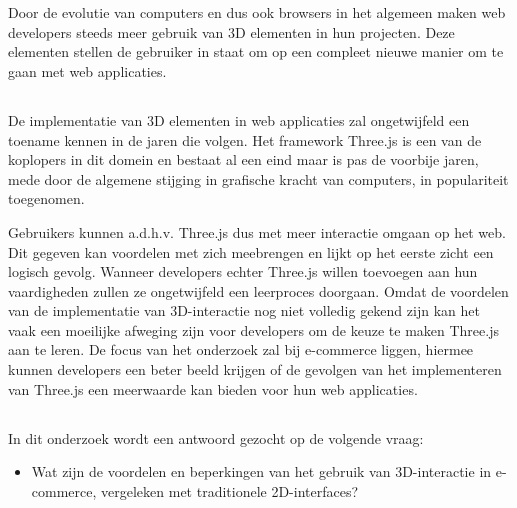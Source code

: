 
\chapter{}%
\label{ch:inleiding}

Door de evolutie van computers en dus ook browsers in het algemeen maken web developers steeds meer gebruik van 3D elementen in hun projecten. Deze elementen stellen de gebruiker in staat om op een compleet nieuwe manier om te gaan met web applicaties. 

\section{}%
\label{sec:probleemstelling}

De implementatie van 3D elementen in web applicaties zal ongetwijfeld een toename kennen in de jaren die volgen. Het framework Three.js is een van de koplopers in dit domein en bestaat al een eind maar is pas de voorbije jaren, mede door de algemene stijging in grafische kracht van computers, in populariteit toegenomen. 

Gebruikers kunnen a.d.h.v. Three.js dus met meer interactie omgaan op het web. Dit gegeven kan voordelen met zich meebrengen en lijkt op het eerste zicht een logisch gevolg. Wanneer developers echter Three.js willen toevoegen aan hun vaardigheden zullen ze ongetwijfeld een leerproces doorgaan. Omdat de voordelen van de implementatie van 3D-interactie nog niet volledig gekend zijn kan het vaak een moeilijke afweging zijn voor developers om de keuze te maken Three.js aan te leren. De focus van het onderzoek zal bij e-commerce liggen, hiermee kunnen developers een beter beeld krijgen of de gevolgen van het implementeren van Three.js een meerwaarde kan bieden voor hun web applicaties.

\section{}%
\label{sec:onderzoeksvraag}

In dit onderzoek wordt een antwoord gezocht op de volgende vraag:

\begin{itemize}
	\item Wat zijn de voordelen en beperkingen van het gebruik van 3D-interactie in e-commerce, vergeleken met traditionele 2D-interfaces?
\end{itemize}

